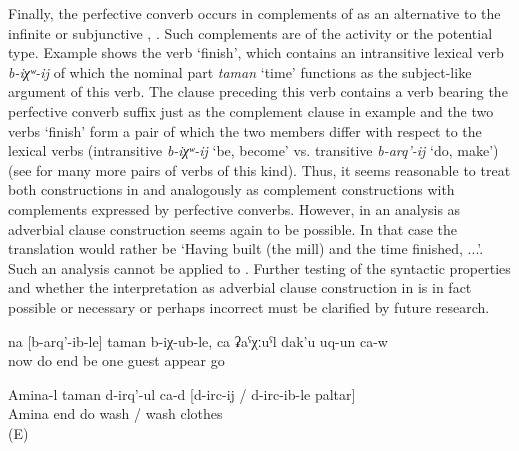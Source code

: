 Finally, the perfective converb occurs in complements of  as an alternative to the infinite or subjunctive  , . Such complements are of the activity or the potential type. Example  shows the verb `finish', which contains an intransitive lexical verb \textit{b-iχʷ-ij} of which the nominal part \textit{taman} `time' functions as the subject-like argument of this verb. The clause preceding this verb contains a verb bearing the perfective converb suffix just as the complement clause in example  and the two verbs `finish' form a pair of which the two members differ with respect to the lexical verbs (intransitive \textit{b-iχʷ-ij} `be, become' vs. transitive \textit{b-arq'-ij} `do, make') (see  for many more pairs of verbs of this kind). Thus, it seems reasonable to treat both constructions in  and  analogously as complement constructions with complements expressed by perfective converbs. However, in   an analysis as adverbial clause construction seems again to be possible. In that case the translation would rather be `Having built (the mill) and the time finished, ...'. Such an analysis cannot be applied to . Further testing of the syntactic properties and whether the interpretation as adverbial clause construction in  is in fact possible or necessary or perhaps incorrect must be clarified by future research.
%
\begin{exe}

	\ex	\label{ex:‎When they finished building, a man appeared}
	\gll	na	[b-arq'-ib-le]	taman	b-iχ-ub-le,	ca	ʡaˁχːuˁl	dak'u	uq-un	ca-w\\
		now	do	end	be	one	guest	appear	go	\\
	\glt	{}
	
	\ex	\label{ex:Aminat finished to wash / washing the clothes}
	\gll	Amina-l taman d-irq'-ul ca-d	 [d-irc-ij	/	d-irc-ib-le	paltar]\\
		Amina	end	do	 wash	/  wash clothes\\
	\glt	{} (E)
\end{exe}


